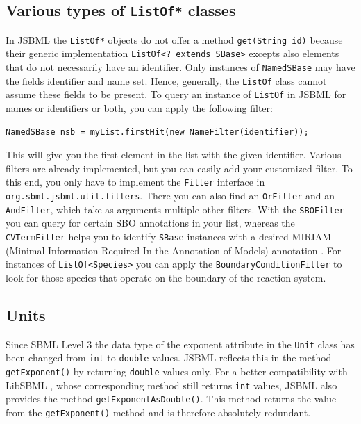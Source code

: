 \documentclass[
  BCOR12mm,
  letterpaper,
  11pt,
  headsepline,
  pointlessnumbers,
  tablecaptionabove,
  onelinecaption,
  headinclude,
  appendixprefix,
  idxtotoc,
  bibtotoc,
  twoside,
  titlepage
]{scrartcl}
\begin{document}
\subsection{Various types of \texttt{ListOf*} classes}

In JSBML the \texttt{ListOf*}
objects do not offer a method
\texttt{get(String id)} because their generic implementation 
\texttt{ListOf<? extends SBase>} excepts also elements that do
not necessarily have an identifier. Only instances of \texttt{NamedSBase} may have
the fields identifier and name set. Hence, generally, the \texttt{ListOf} class
cannot assume these fields to be present. To query an instance of \texttt{ListOf}
in JSBML for names or identifiers or both, you can apply the following filter:
\begin{lstlisting}
NamedSBase nsb = myList.firstHit(new NameFilter(identifier));
\end{lstlisting}
This will give you the first element in the list with the given identifier.
Various filters are already implemented, but you can easily add your 
customized filter. To this end, you only have to implement the \texttt{Filter}
interface in \texttt{org.sbml.jsbml.util.filters}. There you can also find an
\texttt{OrFilter} and an \texttt{AndFilter}, which take as arguments multiple other
filters. With the \texttt{SBOFilter} you can query for certain SBO  annotations \citep{Novere2006,Novere2006b} in
your list, whereas the \texttt{CVTermFilter} helps you to identify \texttt{SBase}
instances with a desired MIRIAM (Minimal Information Required In the Annotation of Models) annotation \citep{Novere2005}. For instances of
\texttt{ListOf<Species>} you can apply the \texttt{BoundaryConditionFilter} to look
for those species that operate on the boundary of the reaction system.


\subsection{Units}

Since SBML Level 3 \citep{Hucka2010a} the data type of the exponent attribute in the \texttt{Unit}
class has been changed from \texttt{int} to \texttt{double} values.
JSBML
reflects this in the method \texttt{getExponent()} by returning \texttt{double}
values only. For a better compatibility with LibSBML
, whose corresponding method still
returns \texttt{int} values, JSBML also provides the method
\texttt{getExponentAsDouble()}. This method returns the value from the
\texttt{getExponent()} method and is therefore absolutely redundant.
\end{document}
